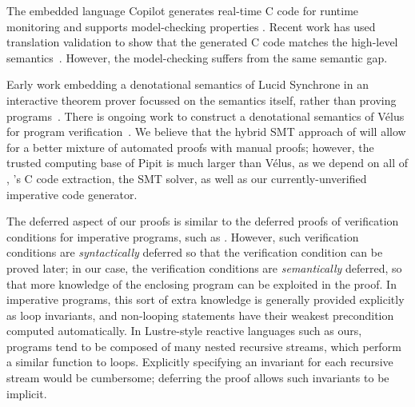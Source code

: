 The embedded language Copilot generates real-time C code for runtime monitoring and supports model-checking properties \cite{laurent2015assuring}.
Recent work has used translation validation to show that the generated C code matches the high-level semantics~\cite{scott2023trustworthy}.
However, the model-checking suffers from the same semantic gap.

Early work embedding a denotational semantics of Lucid Synchrone in an interactive theorem prover focussed on the semantics itself, rather than proving programs~\cite{boulme2001clocked}.
There is ongoing work to construct a denotational semantics of Vélus for program verification~\cite{bourke2022towards}.
We believe that the hybrid SMT approach of \fstar{} will allow for a better mixture of automated proofs with manual proofs;
however, the trusted computing base of Pipit is much larger than Vélus, as we depend on all of \fstar{}, \lowstar{}'s C code extraction, the SMT solver, as well as our currently-unverified imperative code generator.




The deferred aspect of our proofs is similar to the deferred proofs of verification conditions for imperative programs, such as \cite{oconnor2019deferring}.
However, such verification conditions are \emph{syntactically} deferred so that the verification condition can be proved later; in our case, the verification conditions are \emph{semantically} deferred, so that more knowledge of the enclosing program can be exploited in the proof.
In imperative programs, this sort of extra knowledge is generally provided explicitly as loop invariants, and non-looping statements have their weakest precondition computed automatically.
In Lustre-style reactive languages such as ours, programs tend to be composed of many nested recursive streams, which perform a similar function to loops.
Explicitly specifying an invariant for each recursive stream would be cumbersome; deferring the proof allows such invariants to be implicit.

